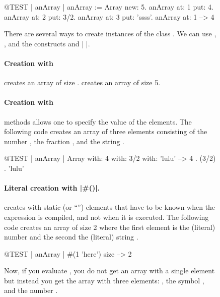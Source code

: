 \documentclass[a4paper,10pt,twoside]{book}
\begin{document}
\begin{figure}
\begin{center}
\begin{code}{@TEST | anArray | }
anArray := Array new: 5.
anArray at: 1 put: 4.
anArray at: 2 put: 3/2.
anArray at: 3 put: 'ssss'.
anArray at: 1 --> 4
\end{code}

There are several ways to create instances of the class .
We can use , , and  the constructs \ct{#( )} and \ct|{ }|.

\paragraph{Creation with }  creates an array of size .
 creates an array of size 5.

\paragraph{Creation with }  methods allows one to specify the value of the elements.  
The following code creates an array of three elements consisting of the number , the fraction , and the string .

\begin{code}{@TEST | anArray |}
Array with: 4 with: 3/2 with: 'lulu' -->  {4 . (3/2) . 'lulu'}
\end{code}

\paragraph{Literal creation with \ct|\#()|.}
\ct{#()} creates  with static (or ``'') elements that have to be known when the expression is compiled, and not when it is executed.
The following code creates an array of size 2 where the first element is the (literal) number  and the second the (literal) string .


\begin{code}{@TEST | anArray |}
#(1 'here') size --> 2
\end{code}

Now, if you evaluate , you do not get an array with a single element  but instead you get the array  \ie with three elements: , the symbol \ct{#+}, and the number .


\end{center}
\end{figure}
\end{document}

